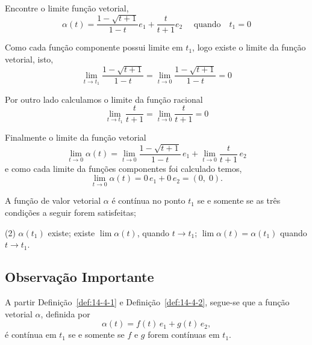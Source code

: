 \begin{exc}
  Encontre o limite função vetorial,
  \begin{equation*}
    \alpha(t) = \frac{1-\sqrt{t+1}}{1-t}e_{1} + \frac{t}{t+1}e_{2}\quad \text{ quando} \quad t_{1}=0
  \end{equation*}
\end{exc}

\solo
Como cada função componente possui limite em \(t_{1}\), logo existe o limite da função vetorial, isto,
\begin{equation*}
  \lim_{t \to t_{1}}\frac{1-\sqrt{t+1}}{1-t}=\lim_{t \to 0}\frac{1-\sqrt{t+1}}{1-t}=0
\end{equation*}

Por outro lado calculamos o limite da função racional
\begin{equation*}
\lim_{t \to t_{1}}\frac{t}{t+1}=\lim_{t \to 0}\frac{t}{t+1}=0
\end{equation*}

Finalmente o limite da função vetorial
\begin{equation*}
\lim_{t \to 0}\alpha(t) = \lim_{t \to 0}\frac{1-\sqrt{t+1}}{1-t}\,e_{1} + \lim_{t \to 0}\frac{t}{t+1}\, e_{2}
\end{equation*}
e como cada limite da funções componentes foi calculado temos,
\begin{equation*}
\lim_{t \to 0}\alpha(t) = 0\,e_{1}+0\,e_{2}=(0, \; 0).
\end{equation*}

\begin{defi}[Continuidade]\label{def:14-4-2}
A função de valor vetorial \(\alpha\) é contínua no ponto \(t_{1}\) se e somente se as três condições a seguir forem
satisfeitas;
\begin{tasks}[label=(\alph*),item-indent=4em,label-width=4ex,ref=(\alph*)](2)
\task \(\alpha(t_{1})\) existe;
\task existe \(\lim \alpha(t)\), quando \(t \to t_{1}\);
\task \(\lim \alpha(t) =\alpha(t_{1})\) quando \( t \to t_{1}\).
\end{tasks}
\end{defi}

%
\subsection*{Observação Importante}
%
A partir  Definição~\ref{def:14-4-1} e Definição~\ref{def:14-4-2}, segue-se que a função vetorial \(\alpha\), definida por
\begin{equation*}
\alpha(t) = f(t)\, e_{1} + g(t)\, e_{2},
\end{equation*}
é contínua em \(t_{1}\) se e somente se \(f\) e \(g\) forem contínuas em \(t_{1}\).

